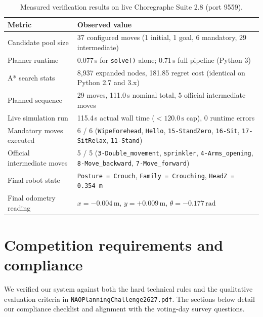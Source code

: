 \documentclass[11pt,a4paper]{article}
\newcommand{\code}[1]{\texttt{#1}}
\begin{document}
\begin{table}[H]
  \centering
  \small
  \caption{Measured verification results on live Choregraphe Suite 2.8 (port 9559).}
  \label{tab:verification}
  \begin{tabularx}{\textwidth}{l X}
    \toprule
    \textbf{Metric} & \textbf{Observed value} \\
    \midrule
    Candidate pool size & 37 configured moves (1 initial, 1 goal, 6 mandatory, 29 intermediate) \\
    Planner runtime & 0.077\,s for \code{solve()} alone; 0.71\,s full pipeline (Python 3) \\
    A* search stats & 8,937 expanded nodes, 181.85 regret cost (identical on Python 2.7 and 3.x) \\
    Planned sequence & 29 moves, 111.0\,s nominal total, 5 official intermediate moves \\
    Live simulation run & 115.4\,s actual wall time ($< 120.0\,\text{s}$ cap), 0 runtime errors \\
    Mandatory moves executed & 6 / 6 (\code{WipeForehead}, \code{Hello}, \code{15-StandZero}, \code{16-Sit}, \code{17-SitRelax}, \code{11-Stand}) \\
    Official intermediate moves & 5 / 5 (\code{3-Double\_movement}, \code{sprinkler}, \code{4-Arms\_opening}, \code{8-Move\_backward}, \code{7-Move\_forward}) \\
    Final robot state & \code{Posture = Crouch}, \code{Family = Crouching}, \code{HeadZ = 0.354\,m} \\
    Final odometry reading & $x = -0.004\,\text{m}$, $y = +0.009\,\text{m}$, $\theta = -0.177\,\text{rad}$ \\
    \bottomrule
  \end{tabularx}
\end{table}

\clearpage

\section{Competition requirements and compliance}

We verified our system against both the hard technical rules and the qualitative evaluation criteria in \code{NAOPlanningChallenge2627.pdf}. The sections below detail our compliance checklist and alignment with the voting-day survey questions.
\end{document}
